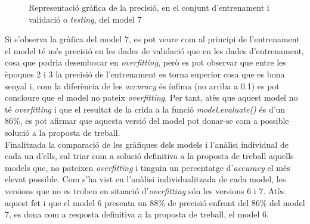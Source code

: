 \documentclass[a4paper,12pt]{report}
\begin{document}
\begin{figure}[H]
    \centering
    \caption{Representació gràfica de la precisió, en el conjunt d'entrenament i validació o \textit{testing}, del model 7}
    \label{fig:model7}
\end{figure}
Si s'observa la gràfica del model 7, es pot veure com al principi de l'entrenament el model té més precisió en les dades de validació que en les dades d'entrenament, cosa que podria desembocar en \textit{overfitting}, però es pot observar que entre les èpoques 2 i 3 la precisió de l'entrenament es torna superior cosa que es bona senyal i, com la diferència de les \textit{accuracy} és ínfima (no arriba a 0.1) es pot concloure que el model no pateix \textit{overfitting}. Per tant, atès que aquest model no té \textit{overfitting} i que el resultat de la crida a la funció \textit{model.evaluate()} és d'un 86\%, es pot afirmar que aquesta versió del model pot donar-se com a possible solució a la proposta de treball.\\
Finalitzada la comparació de les gràfiques dels models i l'anàlisi individual de cada un d'ells, cal triar com a solució definitiva a la proposta de treball aquells models que, no pateixen \textit{overfitting} i tinguin un percentatge d'\textit{accuracy} el més elevat possible. Com s'ha vist en l'anàlisi individualitzada de cada model, les versions que no es troben en situació d'\textit{overfitting} són les versions 6 i 7. Atès aquest fet i que el model 6 presenta un 88\% de precisió enfront del 86\% del model 7, es dona com a resposta definitiva a la proposta de treball, el model 6.\\
\end{document}
